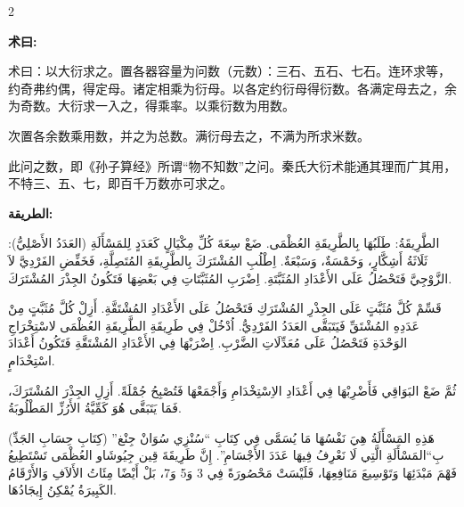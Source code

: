 \documentclass[11pt,a4paper]{article}
\newcommand{\ar}[1]{\arabicfont\beginR #1\endR}
\newenvironment{bilingual}{%
  \begin{paracol}{2}
}{%
  \end{paracol}
}
\newcommand{\cnlabel}[1]{\textcolor{algocolor}{\textbf{#1}}}
\newcommand{\arlabel}[1]{\ar{\textcolor{algocolor}{\textbf{#1}}}}
\begin{document}
\vspace{1em}

\begin{bilingual}

\begin{leftcolumn*}
\cnlabel{术曰:}

术曰：以大衍求之。置各器容量为问数（元数）：三石、五石、七石。连环求等，约奇弗约偶，得定母。诸定相乘为衍母。以各定约衍母得衍数。各满定母去之，余为奇数。大衍求一入之，得乘率。以乘衍数为用数。

次置各余数乘用数，并之为总数。满衍母去之，不满为所求米数。

此问之数，即《孙子算经》所谓``物不知数''之问。秦氏大衍术能通其理而广其用，不特三、五、七，即百千万数亦可求之。
\end{leftcolumn*}

\begin{rightcolumn*}
\arlabel{الطريقة:}

\ar{الطَّرِيقَةُ: طَلَبُهَا بِالطَّرِيقَةِ العُظْمَى. ضَعْ سِعَةَ كُلِّ مِكْيَالٍ كَعَدَدٍ لِلمَسْأَلَةِ (العَدَدُ الأَصْلِيُّ): ثَلَاثَةُ أَشِكَّارٍ، وَخَمْسَةٌ، وَسَبْعَةٌ. اِطْلُبِ المُشْتَرَكَ بِالطَّرِيقَةِ المُتَصِلَّةِ، فَخَفِّضِ الفَرْدِيَّ لاَ الزَّوْجِيَّ فَتَحْصُلُ عَلَى الأَعْدَادِ المُثَبَّتَةِ. اِضْرَبِ المُثَبَّتَاتِ فِي بَعْضِهَا فَتَكُونُ الجِذْرَ المُشْتَرَكَ.}

\ar{قَسِّمْ كُلَّ مُثَبَّتٍ عَلَى الجِذْرِ المُشْتَرَكِ فَتَحْصُلُ عَلَى الأَعْدَادِ المُشْتَقَّةِ. أَزِلْ كُلَّ مُثَبَّتٍ مِنْ عَدَدِهِ المُشْتَقِّ فَيَتَبَقَّى العَدَدُ الفَرْدِيُّ. اُدْخُلْ فِي طَرِيقَةِ الطَّرِيقَةِ العُظْمَى لاسْتِخْرَاجِ الوَحْدَةِ فَتَحْصُلُ عَلَى مُعَدِّلَاتِ الضَّرْبِ. اِضْرَبْهَا فِي الأَعْدَادِ المُشْتَقَّةِ فَتَكُونُ أَعْدَادَ اسْتِخْدَامٍ.}

\ar{ثُمَّ ضَعْ البَوَاقِي فَأَضْرِبْهَا فِي أَعْدَادِ الاِسْتِخْدَامِ وَأَجْمَعْهَا فَتُصْبِحُ جُمْلَةً. أَزِلِ الجِذْرَ المُشْتَرَكَ، فَمَا يَتَبَقَّى هُوَ كَمِّيَّةُ الأَرُزِّ المَطْلُوبَةُ.}

\ar{هَذِهِ المَسْأَلَةُ هِيَ نَفْسُهَا مَا يُسَمَّى فِي كِتَابِ \enquote{سُنْزِي سُوَانْ جِنْغ} (كِتَابِ حِسَابِ الجَدِّ) بِ\enquote{المَسْأَلَةِ الَّتِي لَا نَعْرِفُ فِيهَا عَدَدَ الأَجْسَامِ}. إِنَّ طَرِيقَةَ قِين جِيُوشَاو العُظْمَى تَسْتَطِيعُ فَهْمَ مَبْدَئِهَا وَتَوْسِيعَ مَنَافِعِهَا، فَلَيْسَتْ مَحْصُورَةً فِي 3 وَ5 وَ7، بَلْ أَيْضًا مِئَاتُ الأَلاَفِ وَالأَرْقَامُ الكَبِيرَةُ يُمْكِنُ إِيجَادُهَا.}
\end{rightcolumn*}

\end{bilingual}
\end{document}
